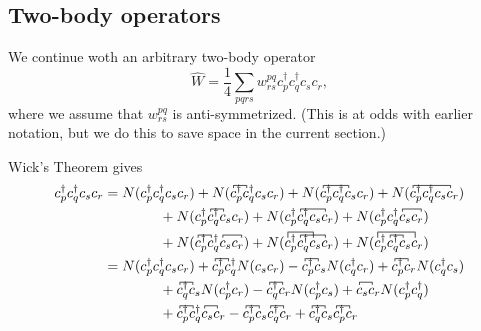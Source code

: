 \documentclass{report}
\theoremstyle{plain}
\theoremstyle{definition}
\begin{document}
\subsection{Two-body operators}

We continue woth an arbitrary two-body operator
\begin{equation}
  \hat{W} = \frac{1}{4} \sum_{pqrs} w^{pq}_{rs} c^\dag_p
  c^\dag_q c_s c_r, 
\end{equation}
where we assume that $w^{pq}_{rs}$ is anti-symmetrized. (This is at
odds with earlier notation, but we do this to save space in the
current section.)

Wick's Theorem gives
\begin{equation}
  \begin{split}
    c^\dag_p c^\dag_q c_s c_r &= N(c^\dag_p c^\dag_q c_s c_r) +
    N(\contraction[.5ex]{}{c}{^{\dag}_p}{c} c^\dag_p c^\dag_q c_s c_r)
    +
    N(\contraction[.5ex]{}{c}{^{\dag}_p c^\dag_q}{c} c^\dag_p c^\dag_q c_s c_r) 
    +
    N(\contraction[.5ex]{}{c}{^{\dag}_p c^\dag_q c_s}{c} c^\dag_p
    c^\dag_q c_s c_r) \\
& \qquad \qquad + 
    N(\contraction[.5ex]{c^\dag_p}{c}{^{\dag}_q}{c} c^\dag_p c^\dag_q c_s c_r)
    +
    N(\contraction[.5ex]{c^\dag_p}{c}{^{\dag}_q c_s}{c} c^\dag_p c^\dag_q c_s c_r)
    +
    N(\contraction[.5ex]{c^\dag_pc^\dag_q}{c}{c_s}{c} c^\dag_p c^\dag_q c_s c_r)
    \\
    &\qquad\qquad
    + N(\contraction[.5ex]{c^\dag_pc^\dag_q}{c}{c_s}{c}
    \contraction[.5ex]{}{c}{^{\dag}_p}{c} c^\dag_p c^\dag_q c_s c_r)
    +
    N(\contraction[.5ex]{c^\dag_p}{c}{{}^\dag_q c_s }{c}
    \contraction[1ex]{}{c}{^{\dag}_p c^\dag_q}{c} c^\dag_p c^\dag_q
    c_s c_r) 
    +
    N(\contraction[1ex]{}{c}{{}^\dag_p c^\dag_q c_s }{c}
    \contraction[.5ex]{c^\dag_p}{c}{{}^\dag_q}{c} c^\dag_p c^\dag_q
    c_s c_r) \\
& = N(c^\dag_p c^\dag_q c_s c_r) 
+ \contraction[.5ex]{}{c}{{}^\dag_p}{c} c^\dag_p c^\dag_q N(c_sc_r)
- \contraction[.5ex]{}{c}{{}^\dag_p}{c} c^\dag_p c_s N(c^\dag_qc_r)
+ \contraction[.5ex]{}{c}{{}^\dag_p}{c} c^\dag_p c_r N(c^\dag_qc_s)\\
&\qquad \qquad + \contraction[.5ex]{}{c}{{}^\dag_q}{c} c^\dag_q c_s N(c^\dag_pc_r) 
- \contraction[.5ex]{}{c}{{}^\dag_q}{c} c^\dag_q c_r N(c^\dag_pc_s)
+ \contraction[.5ex]{}{c}{_s}{c} c_s c_r N(c^\dag_pc^\dag_q) \\
&\qquad \qquad  
+ \contraction[.5ex]{}{c}{{}^\dag_p}{c} c^\dag_p c^\dag_q 
\contraction[.5ex]{}{c}{{}_s}{c} c_s c_r 
- \contraction[.5ex]{}{c}{{}^\dag_p}{c} c^\dag_p c_s 
\contraction[.5ex]{}{c}{{}^\dag_q}{c} c^\dag_q c_r 
+ \contraction[.5ex]{}{c}{{}^\dag_q}{c} c^\dag_q c_s 
\contraction[.5ex]{}{c}{{}^\dag_p}{c} c^\dag_p c_r 
  \end{split}
\end{equation}
\end{document}
